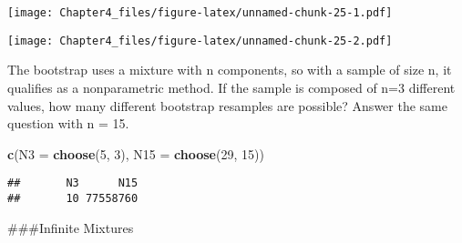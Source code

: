 \documentclass[]{article}
\newenvironment{Shaded}{\begin{snugshade}}{\end{snugshade}}
\newcommand{\DataTypeTok}[1]{\textcolor[rgb]{0.13,0.29,0.53}{#1}}
\newcommand{\DecValTok}[1]{\textcolor[rgb]{0.00,0.00,0.81}{#1}}
\newcommand{\KeywordTok}[1]{\textcolor[rgb]{0.13,0.29,0.53}{\textbf{#1}}}
\newcommand{\NormalTok}[1]{#1}
\newcommand{\OperatorTok}[1]{\textcolor[rgb]{0.81,0.36,0.00}{\textbf{#1}}}
\newcommand{\StringTok}[1]{\textcolor[rgb]{0.31,0.60,0.02}{#1}}
\begin{document}
\begin{Shaded}
\end{Shaded}

\texttt{[image: Chapter4\_files/figure-latex/unnamed-chunk-25-1.pdf]}

\begin{Shaded}
\end{Shaded}

\texttt{[image: Chapter4\_files/figure-latex/unnamed-chunk-25-2.pdf]}

The bootstrap uses a mixture with n components, so with a sample of size
n, it qualifies as a nonparametric method. If the sample is composed of
n=3 different values, how many different bootstrap resamples are
possible? Answer the same question with n = 15.

\begin{Shaded}
\begin{Highlighting}[]
\KeywordTok{c}\NormalTok{(}\DataTypeTok{N3 =} \KeywordTok{choose}\NormalTok{(}\DecValTok{5}\NormalTok{, }\DecValTok{3}\NormalTok{), }\DataTypeTok{N15 =} \KeywordTok{choose}\NormalTok{(}\DecValTok{29}\NormalTok{, }\DecValTok{15}\NormalTok{))}
\end{Highlighting}
\end{Shaded}

\begin{verbatim}
##       N3      N15 
##       10 77558760
\end{verbatim}

\#\#\#Infinite Mixtures
\end{document}
